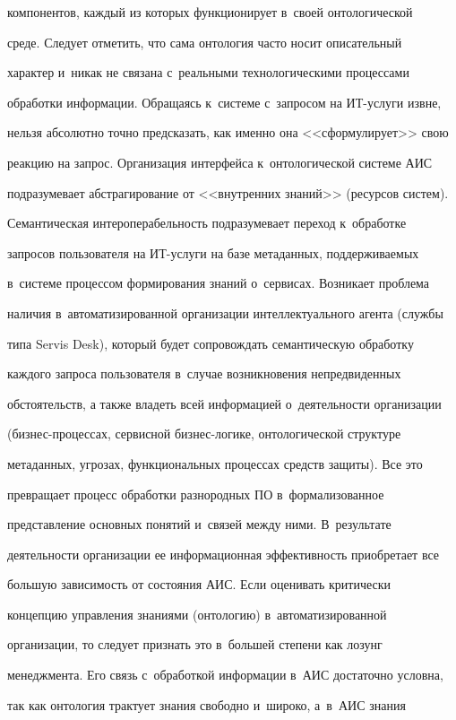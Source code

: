 компонентов, каждый из которых функционирует в~своей онтологической 


среде. Следует отметить, что сама онтология часто носит описательный 


характер и~никак не связана с~реальными технологическими процессами 


обработки информации. Обращаясь к~системе с~запросом на ИТ-услуги извне, 


нельзя абсолютно точно предсказать, как именно она <<сформулирует>> свою 


реакцию на запрос. Организация интерфейса к~онтологической системе АИС 


подразумевает абстрагирование от <<внутренних знаний>> (ресурсов систем). 


Семантическая интероперабельность подразумевает переход к~обработке 


запросов пользователя на ИТ-услуги на базе метаданных, поддерживаемых 


в~системе процессом формирования знаний о~сервисах. Возникает проблема 


наличия в~автоматизированной организации интеллектуального агента (службы 


типа Servis Desk), который будет сопровождать семантическую обработку 


каждого запроса пользователя в~случае возникновения непредвиденных 


обстоятельств, а также владеть всей информацией о~деятельности организации 


(бизнес-процессах, сервисной биз\-нес-ло\-ги\-ке, онтологической структуре 


метаданных, угрозах, функциональных процессах средств защиты). Все это 


превращает процесс обработки разнородных ПО в~формализованное 


представление основных понятий и~связей между ними. В~результате 


деятельности организации ее информационная эффективность приобретает все 


большую зависимость от состояния АИС. Если оценивать критически 


концепцию управ\-ле\-ния знаниями (онтологию) в~автоматизированной 


организации, то следует признать это в~большей степени как лозунг 


менеджмента. Его связь с~обработкой информации в~АИС достаточно условна, 


так как онтология трактует знания свободно и~широко, а~в~АИС знания 


